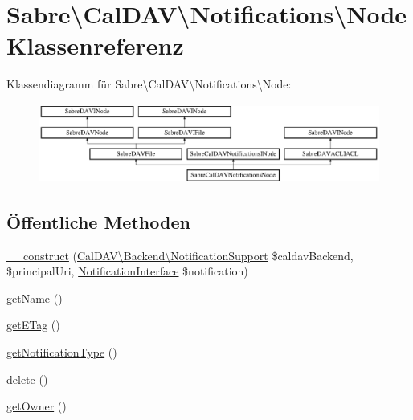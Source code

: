 \hypertarget{class_sabre_1_1_cal_d_a_v_1_1_notifications_1_1_node}{}\section{Sabre\textbackslash{}Cal\+D\+AV\textbackslash{}Notifications\textbackslash{}Node Klassenreferenz}
\label{class_sabre_1_1_cal_d_a_v_1_1_notifications_1_1_node}
Klassendiagramm für Sabre\textbackslash{}Cal\+D\+AV\textbackslash{}Notifications\textbackslash{}Node\+:\begin{figure}[H]
\begin{center}
\leavevmode
\includegraphics[height=2.616822cm]{class_sabre_1_1_cal_d_a_v_1_1_notifications_1_1_node}
\end{center}
\end{figure}
\subsection*{Öffentliche Methoden}
\begin{DoxyCompactItemize}
\item 
\mbox{\hyperlink{class_sabre_1_1_cal_d_a_v_1_1_notifications_1_1_node_a11dae863ce3661482b34d7307662e8f3}{\+\_\+\+\_\+construct}} (\mbox{\hyperlink{interface_sabre_1_1_cal_d_a_v_1_1_backend_1_1_notification_support}{Cal\+D\+A\+V\textbackslash{}\+Backend\textbackslash{}\+Notification\+Support}} \$caldav\+Backend, \$principal\+Uri, \mbox{\hyperlink{interface_sabre_1_1_cal_d_a_v_1_1_xml_1_1_notification_1_1_notification_interface}{Notification\+Interface}} \$notification)
\item 
\mbox{\hyperlink{class_sabre_1_1_cal_d_a_v_1_1_notifications_1_1_node_a9f663d8cbb8ea36a50cdad6c46fa288a}{get\+Name}} ()
\item 
\mbox{\hyperlink{class_sabre_1_1_cal_d_a_v_1_1_notifications_1_1_node_adc6fffcad09368941ba2f17fd4273846}{get\+E\+Tag}} ()
\item 
\mbox{\hyperlink{class_sabre_1_1_cal_d_a_v_1_1_notifications_1_1_node_ac2b3cb401257a3a7b3ab48645d9606b3}{get\+Notification\+Type}} ()
\item 
\mbox{\hyperlink{class_sabre_1_1_cal_d_a_v_1_1_notifications_1_1_node_aac1d2ff35c9ca649c153a03adf2f3aec}{delete}} ()
\item 
\mbox{\hyperlink{class_sabre_1_1_cal_d_a_v_1_1_notifications_1_1_node_a0810acd54778a3067fdae01d77bc8b77}{get\+Owner}} ()
\end{DoxyCompactItemize}
